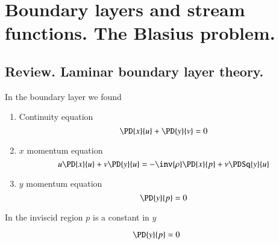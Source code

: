 %
%

\chapter{Boundary layers and stream functions.  The Blasius problem.}
\label{chap:continuumL19}
{}
\date{Mar 23, 2012}

\beginArtWithToc

%

\section{Review.  Laminar boundary layer theory.}

In the boundary layer we found
\begin{enumerate}
\item Continuity equation
\begin{equation}\label{eqn:continuumL19:10}
\PD{x}{u} + \PD{y}{v} = 0
\end{equation}
\item $x$ momentum equation
\begin{equation}\label{eqn:continuumL19:30}
u \PD{x}{u} + v \PD{y}{u} = - \inv{\rho} \PD{x}{p} + \nu \PDSq{y}{u}
\end{equation}
\item $y$ momentum equation
\begin{equation}\label{eqn:continuumL19:50}
\PD{y}{p} = 0
\end{equation}
\end{enumerate}

In the inviscid region $p$ is a constant in $y$

\begin{equation}\label{eqn:continuumL19:70}
\PD{y}{p} = 0
\end{equation}

